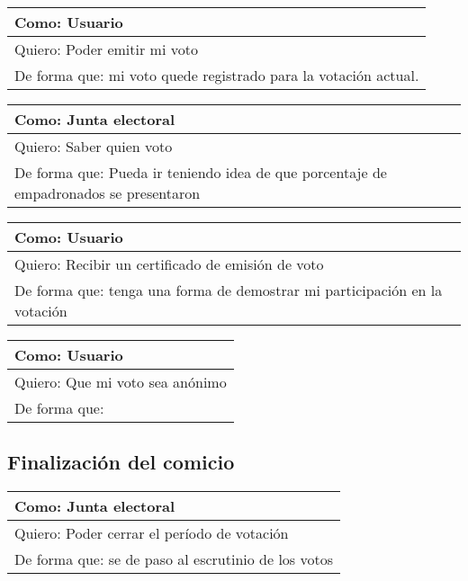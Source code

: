 \bigskip

\begin{tabular}{|l|}
\hline
Como: Usuario\\
\hline
Quiero: Poder emitir mi voto\\
\hline
De forma que: mi voto quede registrado para la votaci\'on actual.\\
\hline
\end{tabular}


\bigskip

\begin{tabular}{|l|}
\hline
Como: Junta electoral\\
\hline
Quiero: Saber quien voto\\
\hline
De forma que: Pueda ir teniendo idea de que porcentaje de empadronados se presentaron\\
\hline
\end{tabular}


\bigskip

\begin{tabular}{|l|}
\hline
Como: Usuario\\
\hline
Quiero: Recibir un certificado de emisi\'on de voto\\
\hline
De forma que: tenga una forma de demostrar mi participaci\'on en la votaci\'on\\
\hline
\end{tabular}


\bigskip

\begin{tabular}{|l|}
\hline
Como: Usuario\\
\hline
Quiero: Que mi voto sea an\'onimo\\
\hline
De forma que:  \\
\hline
\end{tabular}


\bigskip

\subsection{Finalizaci\'on del comicio}

\begin{tabular}{|l|}
\hline
Como: Junta electoral\\
\hline
Quiero: Poder cerrar el per\'iodo de votaci\'on\\
\hline
De forma que: se de paso al escrutinio de los votos\\
\hline
\end{tabular}


